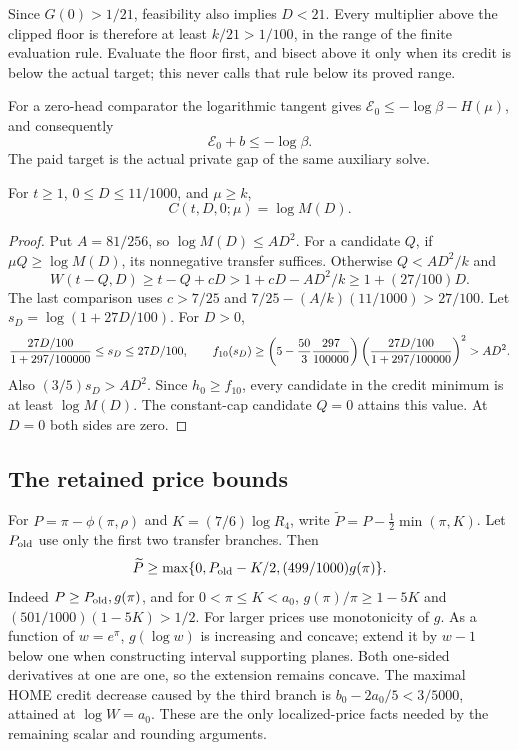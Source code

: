 Since $G(0)>1/21$, feasibility also implies $D<21$.
Every multiplier above the clipped floor is therefore at least
$k/21>1/100$, in the range of the finite evaluation rule.
Evaluate the floor first, and bisect above it only when its credit
is below the actual target; this never calls that rule below its
proved range.

For a zero-head comparator the logarithmic tangent gives
$\mathcal E_0\le-\log\beta-H(\mu)$, and consequently
\[
 \mathcal E_0+b\le-\log\beta.
\]
The paid target is the actual private gap of the same auxiliary solve.

\begin{lemma}\label{simp:tail-credit}
For $t\ge1$, $0\le D\le11/1000$, and $\mu\ge k$,
\[
                  C(t,D,0;\mu)=\log M(D).
\]
\end{lemma}
\begin{proof}
Put $A=81/256$, so $\log M(D)\le AD^2$.
For a candidate $Q$, if $\mu Q\ge\log M(D)$, its
nonnegative transfer suffices.  Otherwise
$Q<AD^2/k$ and
\[
 W(t-Q,D)\ge t-Q+cD
       >1+cD-AD^2/k\ge1+(27/100)D.
\]
The last comparison uses $c>7/25$ and
$7/25-(A/k)(11/1000)>27/100$.
Let $s_D=\log(1+27D/100)$.  For $D>0$,
\[
 {27D/100\over1+297/100000}\le s_D\le27D/100,\qquad
 f_{10}(s_D)\ge
 \left(5-\frac{50}{3}\frac{297}{100000}\right)
 \left({27D/100\over1+297/100000}\right)^2>AD^2.
\]
Also $(3/5)s_D>AD^2$.
Since $h_0\ge f_{10}$, every candidate in the credit minimum
is at least $\log M(D)$.  The constant-cap candidate $Q=0$
attains this value.  At $D=0$ both sides are zero.
\end{proof}

\subsection{The retained price bounds}

For $P=\pi-\phi(\pi,\rho)$ and $K=(7/6)\log R_4$, write
$\widetilde P=P-\frac12\min(\pi,K)$.
Let $P_{\rm old}$ use only the first two transfer branches.  Then
\begin{equation}\label{simp:price-envelope}
 \widetilde P\ge
 \max\{0,P_{\rm old}-K/2,(499/1000)g(\pi)\}.
\end{equation}
Indeed $P\ge P_{\rm old},g(\pi)$, and for $0<\pi\le K<a_0$,
$g(\pi)/\pi\ge1-5K$ and $(501/1000)(1-5K)>1/2$.
For larger prices use monotonicity of $g$.
As a function of $w=e^\pi$, $g(\log w)$ is increasing and concave;
extend it by $w-1$ below one when constructing interval supporting planes.
Both one-sided derivatives at one are one, so the extension remains concave.
The maximal HOME credit decrease caused by the third branch is
$b_0-2a_0/5<3/5000$, attained at $\log W=a_0$.
These are the only localized-price facts needed by the remaining scalar
and rounding arguments.
